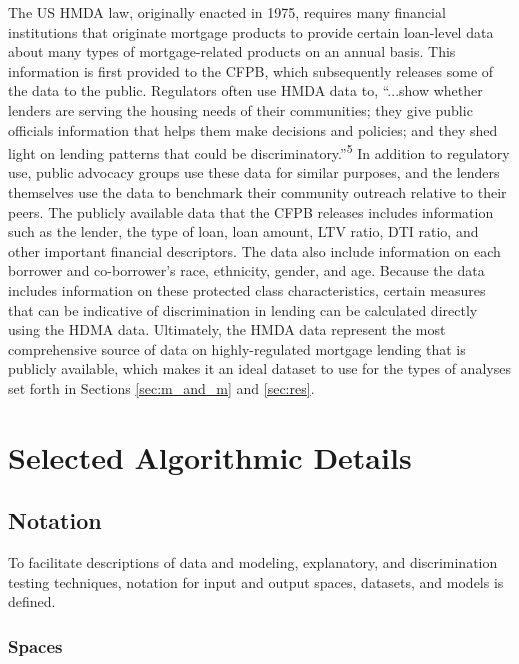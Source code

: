 \documentclass[information,article,submit,moreauthors,pdftex]{definitions/mdpi}
\begin{document}
The US HMDA law, originally enacted in 1975, requires many financial institutions that originate mortgage products to provide certain loan-level data about many types of mortgage-related products on an annual basis. This information is first provided to the CFPB, which subsequently releases some of the data to the public. Regulators often use HMDA data to, ``...show whether lenders are serving the housing needs of their communities; they give public officials information that helps them make decisions and policies; and they shed light on lending patterns that could be discriminatory.''\textsuperscript{5} In addition to regulatory use, public advocacy groups use these data for similar purposes, and the lenders themselves use the data to benchmark their community outreach relative to their peers.  The publicly available data that the CFPB releases includes information such as the lender, the type of loan, loan amount, LTV ratio, DTI ratio, and other important financial descriptors. The data also include information on each borrower and co-borrower’s race, ethnicity, gender, and age. Because the data includes information on these protected class characteristics, certain measures that can be indicative of discrimination in lending can be calculated directly using the HDMA data. Ultimately, the HMDA data represent the most comprehensive source of data on highly-regulated mortgage lending that is publicly available, which makes it an ideal dataset to use for the types of analyses set forth in Sections \ref{sec:m_and_m} and \ref{sec:res}.  

\section{Selected Algorithmic Details}\label{a_sec:algo}

\subsection{Notation}\label{a_ssec:not}

To facilitate descriptions of data and modeling, explanatory, and discrimination testing techniques, notation for input and output spaces, datasets, and models is defined.

\subsubsection{Spaces} 
\end{document}

